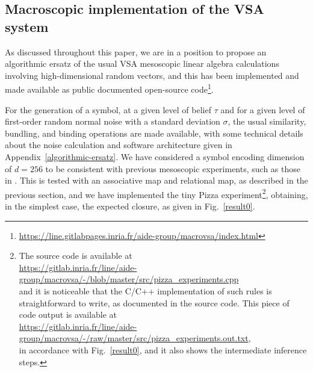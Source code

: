 \documentclass[sn-mathphys]{sn-jnl}
\newcommand{\hhref}[1]{\href{#1}{#1}}
\begin{document}
\subsection{Macroscopic implementation of the VSA system}\label{macrovsa}

As discussed throughout this paper, we are in a position to propose an algorithmic ersatz of the usual VSA mesoscopic linear algebra calculations involving high-dimensional random vectors, and this has been implemented and made available as public documented open-source code\footnote{\hhref{https://line.gitlabpages.inria.fr/aide-group/macrovsa/index.html}}.

For the generation of a symbol, at a given level of belief $\tau$ and for a given level of first-order random normal noise with a standard deviation $\sigma$, the usual similarity, bundling, and binding operations are made available, with some technical details about the noise calculation and software architecture given in Appendix~\ref{algorithmic-ersatz}. We have considered a symbol encoding dimension of $d=256$ to be consistent with previous mesoscopic experiments, such as those in \cite{mercier_ontology_2021}. This is tested with an associative map and relational map, as described in the previous section, and we have implemented the tiny Pizza experiment\footnote{The source code is available at \\ \hhref{https://gitlab.inria.fr/line/aide-group/macrovsa/-/blob/master/src/pizza_experiments.cpp} \\ and it is noticeable that the C/C++ implementation of such rules is straightforward to write, as documented in the source code. This piece of code output is available at \\ \hhref{https://gitlab.inria.fr/line/aide-group/macrovsa/-/raw/master/src/pizza_experiments.out.txt}, \\ in accordance with Fig.~\ref{result0}, and it also shows the intermediate inference steps.}, obtaining, in the simplest case, the expected closure, as given in Fig.~\ref{result0}.
\end{document}
